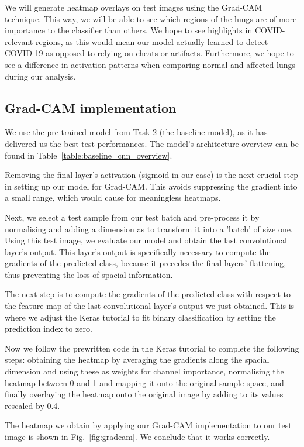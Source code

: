 \documentclass[conference]{IEEEtran}
\begin{document}
We will generate heatmap overlays on test images using the Grad-CAM technique. This way, we will be able to see which regions of the lungs are of more importance to the classifier than others. We hope to see highlights in COVID-relevant regions, as this would mean our model actually learned to detect COVID-19 as opposed to relying on cheats or artifacts. Furthermore, we hope to see a difference in activation patterns when comparing normal and affected lungs during our analysis.

\subsection{Grad-CAM implementation}
We use the pre-trained model from Task 2 (the baseline model), as it has delivered us the best test performances. The model's architecture overview can be found in Table~\ref{table:baseline_cnn_overview}. 

Removing the final layer's activation (sigmoid in our case) is the next crucial step in setting up our model for Grad-CAM\@. This avoids suppressing the gradient into a small range, which would cause for meaningless heatmaps.

Next, we select a test sample from our test batch and pre-process it by normalising and adding a dimension as to transform it into a 'batch' of size one. Using this test image, we evaluate our model and obtain the last convolutional layer's output. This layer's output is specifically necessary to compute the gradients of the predicted class, because it precedes the final layers' flattening, thus preventing the loss of spacial information.

The next step is to compute the gradients of the predicted class with respect to the feature map of the last convolutional layer's output we just obtained. This is where we adjust the Keras tutorial to fit binary classification by setting the prediction index to zero.

Now we follow the prewritten code in the Keras tutorial to complete the following steps: obtaining the heatmap by averaging the gradients along the spacial dimension and using these as weights for channel importance, normalising the heatmap between 0 and 1 and mapping it onto the original sample space, and finally overlaying the heatmap onto the original image by adding to its values rescaled by 0.4.

The heatmap we obtain by applying our Grad-CAM implementation to our test image is shown in Fig.~\ref{fig:gradcam}. We conclude that it works correctly.
\end{document}
